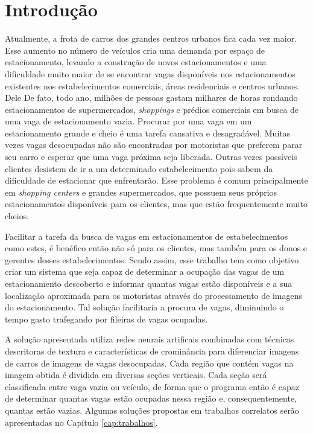 \chapter{Introdução}\label{cap:intro}

			Atualmente, a frota de carros dos grandes centros urbanos fica cada vez maior. Esse aumento no número de veículos cria uma demanda por espaço de estacionamento, levando a construção de novos estacionamentos e uma dificuldade muito maior de se encontrar vagas disponíveis nos estacionamentos existentes nos estabelecimentos comerciais, áreas residenciais e centros urbanos.
			Dele
			De fato, todo ano, milhões de pessoas gastam milhares de horas rondando estacionamentos de supermercados, \textit{shoppings} e prédios comerciais em busca de uma vaga de estacionamento vazia. Procurar por uma vaga em um estacionamento grande e cheio é uma tarefa cansativa e desagradável. Muitas vezes vagas desocupadas não são encontradas por motoristas que preferem parar seu carro e esperar que uma vaga próxima seja liberada. Outras vezes possíveis clientes desistem de ir a um determinado estabelecimento pois sabem da dificuldade de estacionar que enfrentarão. Esse problema é comum principalmente em \textit{shopping centers} e grandes supermercados, que possuem seus próprios estacionamentos disponíveis para os clientes, mas que estão frequentemente muito cheios.
			
			Facilitar a tarefa da busca de vagas em estacionamentos de estabelecimentos como estes, é benéfico então não só para os clientes, mas também para os donos e gerentes desses estabelecimentos. Sendo assim, esse trabalho tem como objetivo criar um sistema que seja capaz de determinar a ocupação das vagas de um estacionamento descoberto e informar quantas vagas estão disponíveis e a sua localização aproximada para os motoristas através do processamento de imagens do estacionamento. Tal solução facilitaria a procura de vagas, diminuindo o tempo gasto trafegando por fileiras de vagas ocupadas.
			
			A solução apresentada utiliza redes neurais artificais combinadas com técnicas descritoras de textura e características de crominância para diferenciar imagens de carros de imagens de vagas desocupadas. Cada região que contém vagas na imagem obtida é dividida em diversas seções verticais. Cada seção será classificada entre vaga vazia ou veículo, de forma que o programa então é capaz de determinar quantas vagas estão ocupadas nessa região e, consequentemente, quantas estão vazias. Algumas soluções propostas em trabalhos correlatos serão apresentadas no Capítulo \ref{cap:trabalhos}.
			
